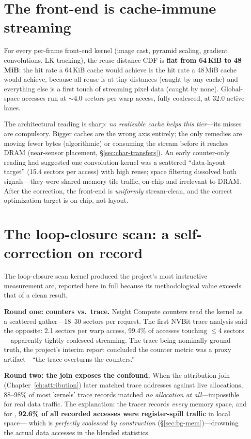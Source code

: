 \section{The front-end is cache-immune streaming}
\label{sec:loc-frontend}

For every per-frame front-end kernel (image cast, pyramid scaling, gradient
convolutions, LK tracking), the reuse-distance CDF is \textbf{flat from
64\,KiB to 48\,MiB}: the hit rate a 64\,KiB cache would achieve is the hit
rate a 48\,MiB cache would achieve, because all reuse is at tiny distances
(caught by any cache) and everything else is a first touch of streaming
pixel data (caught by none). Global-space accesses run at $\sim$4.0 sectors
per warp access, fully coalesced, at 32.0 active lanes.

The architectural reading is sharp: \emph{no realizable cache
helps this tier}---its misses are compulsory. Bigger caches are the wrong
axis entirely; the only remedies are moving fewer bytes (algorithmic) or
consuming the stream before it reaches DRAM (near-sensor placement,
\S\ref{sec:char-transfers}). An early counter-only reading had suggested one
convolution kernel was a scattered ``data-layout target'' (15.4 sectors per
access) with high reuse; space filtering dissolved both signals---they were
shared-memory tile traffic, on-chip and irrelevant to DRAM. After the
correction, the front-end is \emph{uniformly} stream-clean, and the correct
optimization target is on-chip, not layout.

\section{The loop-closure scan: a self-correction on record}
\label{sec:loc-correction}

The loop-closure scan kernel \stTrack{} produced the project's most
instructive measurement arc, reported here in full because its methodological
value exceeds that of a clean result.

\textbf{Round one: counters vs.\ trace.} Nsight Compute counters read the
kernel as a scattered gather---18--30 sectors per request. The first NVBit
trace analysis said the opposite: 2.1 sectors per warp access, 99.4\% of
accesses touching $\leq$4 sectors---apparently tightly coalesced streaming.
The trace being nominally ground truth, the project's interim report
concluded the counter metric was a proxy artifact---``the trace overturns
the counters.''

\textbf{Round two: the join exposes the confound.} When the attribution join
(Chapter~\ref{ch:attribution}) later matched trace addresses against live
allocations, 88--98\% of most kernels' trace records matched \emph{no
allocation at all}---impossible for real data traffic. The explanation: the
tracer records \emph{every} memory space, and for \stTrack{}, \textbf{92.6\%
of all recorded accesses were register-spill traffic} in local space---
which is \emph{perfectly coalesced by construction}
(\S\ref{sec:bg-mem})---drowning the actual data accesses in the blended
statistics.

